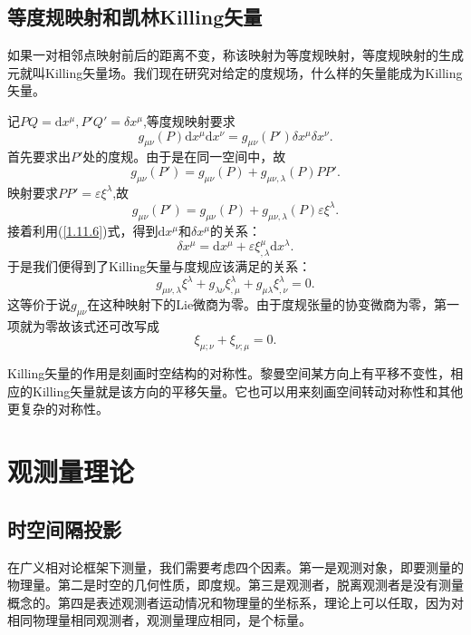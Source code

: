 \documentclass[11pt, a4paper, oneside, onecolumn]{ctexart}
\numberwithin{equation}{subsection}
\begin{document}
\subsection{等度规映射和凯林Killing矢量}
如果一对相邻点映射前后的距离不变，称该映射为等度规映射，等度规映射的生成元就叫Killing矢量场。我们现在研究对给定的度规场，什么样的矢量能成为Killing矢量。

记$PQ=\mathrm{d}x^{\mu},P'Q'=\delta{}x^{\mu}$,等度规映射要求
\begin{equation}
g_{\mu\nu}\left(P\right)\mathrm{d}x^{\mu}\mathrm{d}x^{\nu}=g_{\mu\nu}\left(P'\right)\delta{}x^{\mu}\delta{}x^{\nu}.
\end{equation}
首先要求出$P'$处的度规。由于是在同一空间中，故
\begin{equation}
g_{\mu\nu}\left(P'\right)=g_{\mu\nu}\left(P\right)+g_{\mu\nu,\lambda}\left(P\right)PP'.
\end{equation}
映射要求$PP'=\varepsilon\xi^{\lambda}$,故
\begin{equation}
g_{\mu\nu}\left(P'\right)=g_{\mu\nu}\left(P\right)+g_{\mu\nu,\lambda}\left(P\right)\varepsilon\xi^{\lambda}.
\end{equation}
接着利用(\ref{1.11.6})式，得到$\mathrm{d}x^{\mu}$和$\delta{}x^{\mu}$的关系：
\begin{equation}
\delta{}x^{\mu}=\mathrm{d}x^{\mu}+\varepsilon\xi^{\mu}_{,\lambda}\mathrm{d}x^{\lambda}.
\end{equation}
于是我们便得到了Killing矢量与度规应该满足的关系：
\begin{equation}
g_{\mu\nu,\lambda}\xi^{\lambda}+g_{\lambda\nu}\xi^{\lambda}_{,\mu}+g_{\mu\lambda}\xi^{\lambda}_{,\nu}=0.
\end{equation}
这等价于说$g_{\mu\nu}$在这种映射下的Lie微商为零。由于度规张量的协变微商为零，第一项就为零故该式还可改写成
\begin{equation}
\xi_{\mu;\nu}+\xi_{\nu;\mu}=0.\label{1.12.6}
\end{equation}

Killing矢量的作用是刻画时空结构的对称性。黎曼空间某方向上有平移不变性，相应的Killing矢量就是该方向的平移矢量。它也可以用来刻画空间转动对称性和其他更复杂的对称性。

\newpage
\section{观测量理论}
\subsection{时空间隔投影}
在广义相对论框架下测量，我们需要考虑四个因素。第一是观测对象，即要测量的物理量。第二是时空的几何性质，即度规。第三是观测者，脱离观测者是没有测量概念的。第四是表述观测者运动情况和物理量的坐标系，理论上可以任取，因为对相同物理量相同观测者，观测量理应相同，是个标量。
\end{document}
